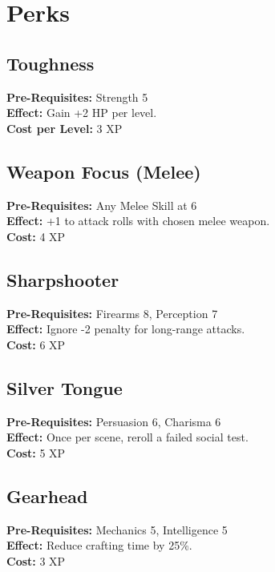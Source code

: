 \documentclass[12pt]{article}
\begin{document}
\section{Perks}
\begin{multicols}{2}

\subsection*{Toughness}
\textbf{Pre-Requisites:} Strength 5\\
\textbf{Effect:} Gain +2 HP per level.\\
\textbf{Cost per Level:} 3 XP

\medskip

\subsection*{Weapon Focus (Melee)}
\textbf{Pre-Requisites:} Any Melee Skill at 6\\
\textbf{Effect:} +1 to attack rolls with chosen melee weapon.\\
\textbf{Cost:} 4 XP

\medskip

\subsection*{Sharpshooter}
\textbf{Pre-Requisites:} Firearms 8, Perception 7\\
\textbf{Effect:} Ignore -2 penalty for long-range attacks.\\
\textbf{Cost:} 6 XP

\medskip

\subsection*{Silver Tongue}
\textbf{Pre-Requisites:} Persuasion 6, Charisma 6\\
\textbf{Effect:} Once per scene, reroll a failed social test.\\
\textbf{Cost:} 5 XP

\medskip

\subsection*{Gearhead}
\textbf{Pre-Requisites:} Mechanics 5, Intelligence 5\\
\textbf{Effect:} Reduce crafting time by 25\%.\\
\textbf{Cost:} 3 XP


\end{multicols}
\end{document}
